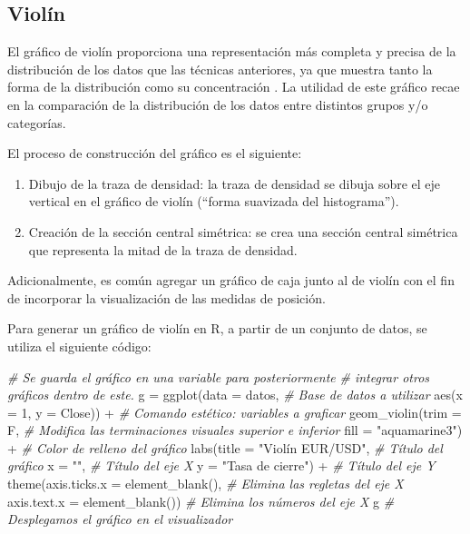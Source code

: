 \documentclass[
]{book}
\newenvironment{Shaded}{\begin{snugshade}}{\end{snugshade}}
\newcommand{\AttributeTok}[1]{\textcolor[rgb]{0.77,0.63,0.00}{#1}}
\newcommand{\CommentTok}[1]{\textcolor[rgb]{0.56,0.35,0.01}{\textit{#1}}}
\newcommand{\DecValTok}[1]{\textcolor[rgb]{0.00,0.00,0.81}{#1}}
\newcommand{\FunctionTok}[1]{\textcolor[rgb]{0.00,0.00,0.00}{#1}}
\newcommand{\NormalTok}[1]{#1}
\newcommand{\OtherTok}[1]{\textcolor[rgb]{0.56,0.35,0.01}{#1}}
\newcommand{\SpecialCharTok}[1]{\textcolor[rgb]{0.00,0.00,0.00}{#1}}
\newcommand{\StringTok}[1]{\textcolor[rgb]{0.31,0.60,0.02}{#1}}
\providecommand{\tightlist}{%
  \setlength{\itemsep}{0pt}\setlength{\parskip}{0pt}}
\begin{document}
\hypertarget{violuxedn}{%
\subsection{Violín}\label{violuxedn}}

El gráfico de violín proporciona una representación más completa y precisa de la distribución de los datos que las técnicas anteriores, ya que muestra tanto la forma de la distribución como su concentración \citep{hintze1998violin}. La utilidad de este gráfico recae en la comparación de la distribución de los datos entre distintos grupos y/o categorías.

El proceso de construcción del gráfico es el siguiente:

\begin{enumerate}
\def\labelenumi{\arabic{enumi}.}
\tightlist
\item
  Dibujo de la traza de densidad: la traza de densidad se dibuja sobre el eje vertical en el gráfico de violín (``forma suavizada del histograma'').
\item
  Creación de la sección central simétrica: se crea una sección central simétrica que representa la mitad de la traza de densidad.
\end{enumerate}

Adicionalmente, es común agregar un gráfico de caja junto al de violín con el fin de incorporar la visualización de las medidas de posición.

Para generar un gráfico de violín en R, a partir de un conjunto de datos, se utiliza el siguiente código:

\begin{Shaded}
\begin{Highlighting}[]
\CommentTok{\# Se guarda el gráfico en una variable para posteriormente}
\CommentTok{\# integrar otros gráficos dentro de este.}
\NormalTok{g }\OtherTok{=} \FunctionTok{ggplot}\NormalTok{(}\AttributeTok{data =}\NormalTok{ datos, }\CommentTok{\# Base de datos a utilizar}
           \FunctionTok{aes}\NormalTok{(}\AttributeTok{x =} \DecValTok{1}\NormalTok{, }\AttributeTok{y =}\NormalTok{ Close)) }\SpecialCharTok{+} \CommentTok{\# Comando estético: variables a graficar }
  \FunctionTok{geom\_violin}\NormalTok{(}\AttributeTok{trim =}\NormalTok{ F, }\CommentTok{\# Modifica las terminaciones visuales superior e inferior}
              \AttributeTok{fill =} \StringTok{"aquamarine3"}\NormalTok{) }\SpecialCharTok{+} \CommentTok{\# Color de relleno del gráfico}
  \FunctionTok{labs}\NormalTok{(}\AttributeTok{title =} \StringTok{"Violín EUR/USD"}\NormalTok{, }\CommentTok{\# Título del gráfico}
       \AttributeTok{x =} \StringTok{""}\NormalTok{, }\CommentTok{\# Título del eje X}
       \AttributeTok{y =} \StringTok{"Tasa de cierre"}\NormalTok{) }\SpecialCharTok{+} \CommentTok{\# Título del eje Y}
  \FunctionTok{theme}\NormalTok{(}\AttributeTok{axis.ticks.x =} \FunctionTok{element\_blank}\NormalTok{(), }\CommentTok{\# Elimina las regletas del eje X}
        \AttributeTok{axis.text.x =} \FunctionTok{element\_blank}\NormalTok{()) }\CommentTok{\# Elimina los números del eje X}
\NormalTok{g }\CommentTok{\# Desplegamos el gráfico en el visualizador}
\end{Highlighting}
\end{Shaded}
\end{document}
